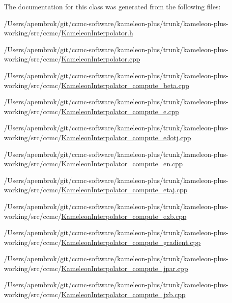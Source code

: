 The documentation for this class was generated from the following files\-:\begin{DoxyCompactItemize}
\item 
/\-Users/apembrok/git/ccmc-\/software/kameleon-\/plus/trunk/kameleon-\/plus-\/working/src/ccmc/\hyperlink{_kameleon_interpolator_8h}{Kameleon\-Interpolator.\-h}\item 
/\-Users/apembrok/git/ccmc-\/software/kameleon-\/plus/trunk/kameleon-\/plus-\/working/src/ccmc/\hyperlink{_kameleon_interpolator_8cpp}{Kameleon\-Interpolator.\-cpp}\item 
/\-Users/apembrok/git/ccmc-\/software/kameleon-\/plus/trunk/kameleon-\/plus-\/working/src/ccmc/\hyperlink{_kameleon_interpolator__compute__beta_8cpp}{Kameleon\-Interpolator\-\_\-compute\-\_\-beta.\-cpp}\item 
/\-Users/apembrok/git/ccmc-\/software/kameleon-\/plus/trunk/kameleon-\/plus-\/working/src/ccmc/\hyperlink{_kameleon_interpolator__compute__e_8cpp}{Kameleon\-Interpolator\-\_\-compute\-\_\-e.\-cpp}\item 
/\-Users/apembrok/git/ccmc-\/software/kameleon-\/plus/trunk/kameleon-\/plus-\/working/src/ccmc/\hyperlink{_kameleon_interpolator__compute__edotj_8cpp}{Kameleon\-Interpolator\-\_\-compute\-\_\-edotj.\-cpp}\item 
/\-Users/apembrok/git/ccmc-\/software/kameleon-\/plus/trunk/kameleon-\/plus-\/working/src/ccmc/\hyperlink{_kameleon_interpolator__compute__en_8cpp}{Kameleon\-Interpolator\-\_\-compute\-\_\-en.\-cpp}\item 
/\-Users/apembrok/git/ccmc-\/software/kameleon-\/plus/trunk/kameleon-\/plus-\/working/src/ccmc/\hyperlink{_kameleon_interpolator__compute__etaj_8cpp}{Kameleon\-Interpolator\-\_\-compute\-\_\-etaj.\-cpp}\item 
/\-Users/apembrok/git/ccmc-\/software/kameleon-\/plus/trunk/kameleon-\/plus-\/working/src/ccmc/\hyperlink{_kameleon_interpolator__compute__exb_8cpp}{Kameleon\-Interpolator\-\_\-compute\-\_\-exb.\-cpp}\item 
/\-Users/apembrok/git/ccmc-\/software/kameleon-\/plus/trunk/kameleon-\/plus-\/working/src/ccmc/\hyperlink{_kameleon_interpolator__compute__gradient_8cpp}{Kameleon\-Interpolator\-\_\-compute\-\_\-gradient.\-cpp}\item 
/\-Users/apembrok/git/ccmc-\/software/kameleon-\/plus/trunk/kameleon-\/plus-\/working/src/ccmc/\hyperlink{_kameleon_interpolator__compute__jpar_8cpp}{Kameleon\-Interpolator\-\_\-compute\-\_\-jpar.\-cpp}\item 
/\-Users/apembrok/git/ccmc-\/software/kameleon-\/plus/trunk/kameleon-\/plus-\/working/src/ccmc/\hyperlink{_kameleon_interpolator__compute__jxb_8cpp}{Kameleon\-Interpolator\-\_\-compute\-\_\-jxb.\-cpp}\item 

\end{DoxyCompactItemize}
